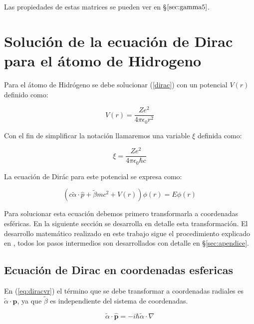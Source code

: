 \documentclass[a4paper, 12pt]{article} %
\begin{document}
Las propiedades de estas matrices se pueden ver en \S$\ref{sec:gamma5}$.


\section{Soluci\'on de la ecuaci\'on de Dirac para el \'atomo de Hidrogeno}


Para el \'atomo de Hidr\'ogeno se debe solucionar (\ref{dirac})
con un potencial $V(r)$ definido como:

\begin{equation}
V(r) = \dfrac{Ze^2}{4\pi\epsilon_0 r^2}
\end{equation}

Con el fin de simplificar la notaci\'on llamaremos una variable
$\xi$ definida como:

\begin{equation}
\xi = \dfrac{Ze^2}{4\pi \epsilon_0 \hbar c}
\end{equation}

La ecuaci\'on de Dir\'ac para este potencial se expresa como:

\begin{equation}\label{eq:diracvr}
(c \widetilde{\alpha} \cdot \hat{p} + \widetilde{\beta} m c^2 + V(r) ) \phi(r) = E \phi (r)
\end{equation}

Para solucionar esta ecuaci\'on debemos primero transformarla a coordenadas
esf\'ericas. En la siguiente secci\'on se desarrolla en detalle esta transformaci\'on.
El desarrollo matem\'atico realizado en este trabajo sigue el procedimiento 
explicado en \cite{strange}, todos los pasos intermedios son desarrollados con 
detalle en \S \ref{sec:apendice}. 
\subsection{Ecuaci\'on de Dirac en coordenadas esfericas}

En (\ref{eq:diracvr}) el t\'ermino que se debe transformar a coordenadas radiales
 es $\widetilde{\alpha} \cdot \hat{\mathbf{p}}$, ya que $\widetilde{\beta}$ es independiente del sistema de coordenadas. 

\begin{equation}\label{eq:alphap}
\widetilde{\alpha} \cdot \hat{\mathbf{p}} = -i \hbar \widetilde{\alpha} \cdot \nabla
\end{equation}
\end{document}
